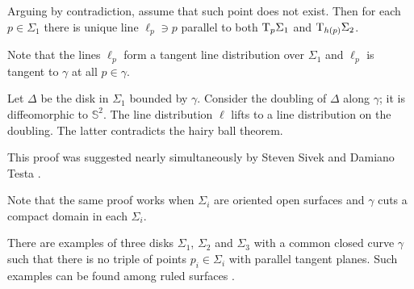 \medskip

Arguing by contradiction,
assume that such point does not exist.
Then for each $p\in\Sigma_1$
there is unique line $\ell_p\ni p$ 
 parallel to both $\mathrm{T}_{p} \Sigma_1$ and $\mathrm{T}_{h(p)} \Sigma_2$.

Note that the lines $\ell_p$ form a tangent line distribution over $\Sigma_1$
and $\ell_p$ is tangent to $\gamma$ at all $p\in\gamma$.

Let $\Delta$ be the disk in $\Sigma_1$ bounded by $\gamma$.
Consider the doubling of $\Delta$ along  $\gamma$;
it is diffeomorphic to $\mathbb S^2$.
The line distribution $\ell$ lifts to a line distribution on the doubling.
The latter contradicts the hairy ball theorem.\qeds


This proof was suggested nearly simultaneously 
by Steven Sivek 
and Damiano Testa \cite[see][]{two-disks}.

Note that the same proof works when $\Sigma_i$ are oriented open surfaces and $\gamma$ cuts a compact domain in each $\Sigma_i$.

There are examples of three disks $\Sigma_1$, $\Sigma_2$ and $\Sigma_3$
with a common closed curve $\gamma$ such that there is
no triple of points $p_i\in\Sigma_i$ with parallel tangent planes.
Such examples can be found among ruled surfaces \cite[see][]{three-disks}.

